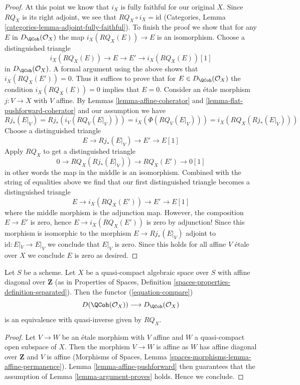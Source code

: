 \begin{proof}
\medskip\noindent
At this point we know that $i_X$ is fully faithful for our original $X$.
Since $RQ_X$ is its right adjoint, we see that
$RQ_X \circ i_X = \text{id}$ (Categories, Lemma
\ref{categories-lemma-adjoint-fully-faithful}).
To finish the proof we show that for any
$E$ in $D_\QCoh(\mathcal{O}_X)$ the map
$i_X(RQ_X(E)) \to E$ is an isomorphism. Choose a distinguished triangle
$$
i_X(RQ_X(E)) \to E \to E' \to i_X(RQ_X(E))[1]
$$
in $D_\QCoh(\mathcal{O}_X)$. A formal argument using the
above shows that $i_X(RQ_X(E')) = 0$. Thus it suffices to prove that
for $E \in D_\QCoh(\mathcal{O}_X)$ the condition
$i_X(RQ_X(E)) = 0$ implies that $E = 0$. Consider an \'etale morphism
$j : V \to X$ with $V$ affine. By
Lemmas \ref{lemma-affine-coherator} and
\ref{lemma-flat-pushforward-coherator}
and our assumption we have
$$
Rj_*(E|_V) = Rj_*(i_V(RQ_V(E|_V))) = i_X(\Phi(RQ_V(E|_V))) =
i_X(RQ_X(Rj_*(E|_V)))
$$
Choose a distinguished triangle
$$
E \to Rj_*(E|_V) \to E' \to E[1]
$$
Apply $RQ_X$ to get a distinguished triangle
$$
0 \to RQ_X(Rj_*(E|_V)) \to RQ_X(E') \to 0[1]
$$
in other words the map in the middle is an isomorphism.
Combined with the string of equalities above we find
that our first distinguished triangle becomes a distinguished triangle
$$
E \to i_X(RQ_X(E')) \to E' \to E[1]
$$
where the middle morphism is the adjunction map. However, the composition
$E \to E'$ is zero, hence $E \to i_X(RQ_X(E'))$ is zero by adjunction!
Since this morphism is isomorphic to the morphism
$E \to Rj_*(E|_V)$ adjoint to $\text{id} : E|_V \to E|_V$ we
conclude that $E|_V$ is zero. Since this holds for all
affine $V$ \'etale over $X$ we conclude $E$ is zero as desired.
\end{proof}

\begin{proposition}
\label{proposition-quasi-compact-affine-diagonal}
Let $S$ be a scheme. Let $X$ be a quasi-compact algebraic space over $S$
with affine diagonal over $\mathbf{Z}$ (as in Properties of Spaces, Definition
\ref{spaces-properties-definition-separated}). Then the functor
(\ref{equation-compare})
$$
D(\QCoh(\mathcal{O}_X))
\longrightarrow
D_\QCoh(\mathcal{O}_X)
$$
is an equivalence with quasi-inverse given by $RQ_X$.
\end{proposition}

\begin{proof}
Let $V \to W$ be an \'etale morphism with $V$ affine and $W$ a
quasi-compact open subspace of $X$. Then 
the morphism $V \to W$ is affine as $W$ has affine diagonal over $\mathbf{Z}$
and $V$ is affine
(Morphisms of Spaces, Lemma \ref{spaces-morphisms-lemma-affine-permanence}).
Lemma \ref{lemma-affine-pushforward} then guarantees that
the assumption of Lemma \ref{lemma-argument-proves} holds.
Hence we conclude.
\end{proof}

